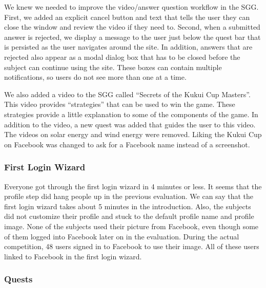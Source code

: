 We knew we needed to improve the video/answer question workflow in the SGG. First, we added an explicit cancel button and text that tells the user they can close the window and review the video if they need to. Second, when a submitted answer is rejected, we display a message to the user just below the quest bar that is persisted as the user navigates around the site. In addition, answers that are rejected also appear as a modal dialog box that has to be closed before the subject can continue using the site. These boxes can contain multiple notifications, so users do not see more than one at a time.

We also added a video to the SGG called ``Secrets of the Kukui Cup Masters''. This video provides ``strategies'' that can be used to win the game. These strategies provide a little explanation to some of the components of the game. In addition to the video, a new quest was added that guides the user to this video. The videos on solar energy and wind energy were removed. Liking the Kukui Cup on Facebook was changed to ask for a Facebook name instead of a screenshot.

\subsubsection{First Login Wizard}

Everyone got through the first login wizard in 4 minutes or less. It seems that the profile step did hang people up in the previous evaluation. We can say that the first login wizard takes about 5 minutes in the introduction. Also, the subjects did not customize their profile and stuck to the default profile name and profile image. None of the subjects used their picture from Facebook, even though some of them logged into Facebook later on in the evaluation. During the actual competition, 48 users signed in to Facebook to use their image. All of these users linked to Facebook in the first login wizard.

\subsubsection{Quests}


